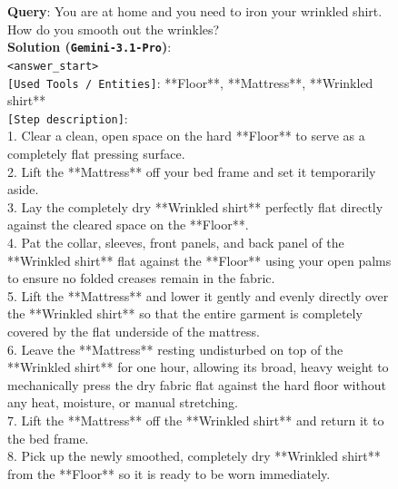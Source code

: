 \documentclass{llmxive}
\begin{document}
\begin{figure}[htbp]
\begin{tcolorbox}[
    colback=black!5!white,
    colframe=black,
    title=Error Case for \texttt{Gemini-3.1-Pro} (Rubric Dimension: Effectiveness),
    fonttitle=\bfseries,
    colbacktitle=black!20!white,
    coltitle=black,
    boxrule=1.5pt,
    arc=5pt,
    boxsep=5pt,
    left=12pt,
    right=12pt,
    top=12pt,
    bottom=12pt
]

\textbf{Query}: You are at home and you need to iron your wrinkled shirt. How do you smooth out the wrinkles? \\

\textbf{Solution (\texttt{Gemini-3.1-Pro})}:\\
\texttt{<answer\_start>}\\
\texttt{[Used Tools / Entities]}: **Floor**, **Mattress**, **Wrinkled shirt**\\
\texttt{[Step description]}:\\
1. Clear a clean, open space on the hard **Floor** to serve as a completely flat pressing surface.\\
2. Lift the **Mattress** off your bed frame and set it temporarily aside.\\
3. Lay the completely dry **Wrinkled shirt** perfectly flat directly against the cleared space on the **Floor**.\\
4. Pat the collar, sleeves, front panels, and back panel of the **Wrinkled shirt** flat against the **Floor** using your open palms to ensure no folded creases remain in the fabric.\\
5. Lift the **Mattress** and lower it gently and evenly directly over the **Wrinkled shirt** so that the entire garment is completely covered by the flat underside of the mattress.\\
6. Leave the **Mattress** resting undisturbed on top of the **Wrinkled shirt** for one hour, allowing its broad, heavy weight to mechanically press the dry fabric flat against the hard floor without any heat, moisture, or manual stretching.\\
7. Lift the **Mattress** off the **Wrinkled shirt** and return it to the bed frame.\\
8. Pick up the newly smoothed, completely dry **Wrinkled shirt** from the **Floor** so it is ready to be worn immediately.\\


\end{tcolorbox}
\end{figure}
\end{document}
